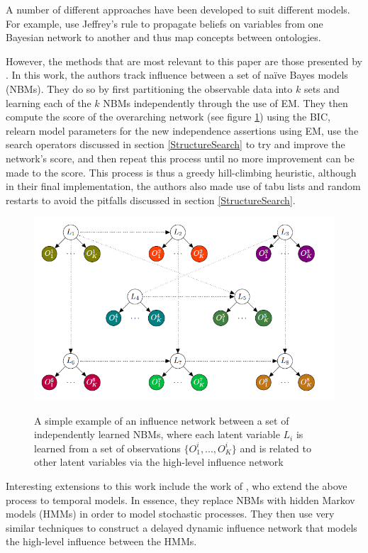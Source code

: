 \documentclass [11pt]{article}
\begin{document}
A number of different approaches have been developed to suit different models. For example, \cite{Pan05} use Jeffrey's rule \citep{pearl90} to propagate beliefs on variables from one Bayesian network to another and thus map concepts between ontologies. 

However, the methods that are most relevant to this paper are those presented by \cite{ajoodha17}. In this work, the authors track influence between a set of na\"{i}ve Bayes models (NBMs). They do so by first partitioning the observable data into $k$ sets and learning each of the $k$ NBMs independently through the use of EM. They then compute the score of the overarching network (see figure \ref{fig:ajoodha}) using the BIC, relearn model parameters for the new independence assertions using EM, use the search operators discussed in section \ref{StructureSearch} to try and improve the network's score, and then repeat this process until no more improvement can be made to the score. This process is thus a greedy hill-climbing heuristic, although in their final implementation, the authors also made use of tabu lists and random restarts to avoid the pitfalls discussed in section \ref{StructureSearch}.
\begin{figure}[H]
\centering
\caption{A simple example of an influence network between a set of independently learned NBMs, where each latent variable $L_{i}$ is learned from a set of observations $\{O_{1}^{i},...,O_{K}^{i}\}$ and is related to other latent variables via the high-level influence network \citep{ajoodha17}}
\includegraphics[width=12cm]{ajoodha.png}\label{fig:ajoodha}
\end{figure}
Interesting extensions to this work include the work of \cite{ajoodha18}, who extend the above process to temporal models. In essence, they replace NBMs with hidden Markov models (HMMs) in order to model stochastic processes. They then use very similar techniques to construct a delayed dynamic influence network that models the high-level influence between the HMMs.
\end{document}
